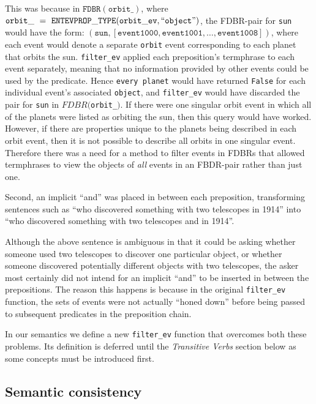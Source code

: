 \documentclass[../main.tex]{subfiles}
\begin{document}
This was because in $\mathtt{FDBR}(\mathtt{orbit\_})$, where $\mathtt{orbit\_}\ =\ \mathtt{ENTEVPROP\_TYPE}(\mathtt{orbit\_ev},\allowbreak \text{``\texttt{object}''})$, the FDBR-pair for \texttt{sun} would have the form: $(\mathtt{sun}, [\mathtt{event1000}, \mathtt{event1001} , \allowbreak \dots , \mathtt{event1008} ])$, where each event would denote a separate \texttt{orbit} event corresponding to each planet that orbits the sun.  \texttt{filter\_ev} applied each preposition's termphrase to each event separately, meaning that no information provided by other events could be used by the predicate.  Hence \texttt{every planet} would have returned \texttt{False} for each individual event's associated \texttt{object}, and \texttt{filter\_ev} would have discarded the pair for \texttt{sun} in $FDBR($\texttt{orbit\_}$)$.  If there were one singular orbit event in which all of the planets were listed as orbiting the sun, then this query would have worked.  However, if there are properties unique to the planets being described in each orbit event, then it is not possible to describe all orbits in one singular event.  Therefore there was a need for a method to filter events in FDBRs that allowed termphrases to view the objects of {\em all} events in an FBDR-pair rather than just one.  

Second, an implicit ``and'' was placed in between each preposition, transforming sentences such as ``who discovered something with two telescopes in 1914'' into ``who discovered something with two telescopes and in 1914''.

Although the above sentence is ambiguous in that it could be asking whether someone used two telescopes to discover one particular object, or whether
someone discovered potentially different objects with two telescopes, the asker most certainly did not intend for an implicit ``and'' to be inserted in between the prepositions.
The reason this happens is because in the original \texttt{filter\_ev} function, the sets of events were not actually ``honed down'' before being passed to subsequent predicates in the preposition chain.

In our semantics we define a new \texttt{filter\_ev} function that overcomes
both these problems.  Its definition is deferred until the {\em Transitive Verbs}
section below as some concepts must be introduced first.

\subsection{Semantic consistency}
\end{document}
